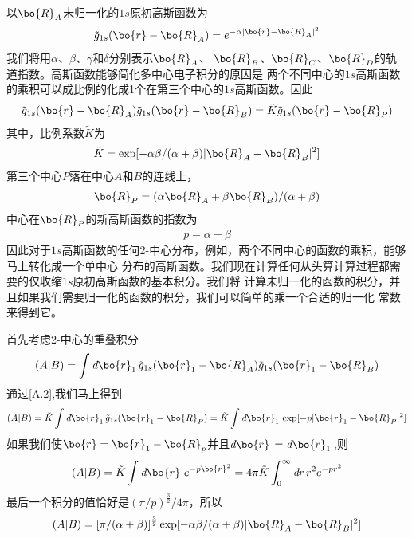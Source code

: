 以$\bo{R}_A$未归一化的$1s$原初高斯函数为
\begin{align}
	\label{A.1}
	\tilde{g}_{1s}(\bo{r}-\bo{R}_A)=e^{-\alpha\lvert \bo{r}-\bo{R}_A \rvert ^2}
\end{align}
我们将用$\alpha$、$\beta$、$\gamma$和$\delta$分别表示$\bo{R}_A$、
$\bo{R}_B$、$\bo{R}_C$、$\bo{R}_D$的轨道指数。高斯函数能够简化多中心电子积分的原因是
两个不同中心的$1s$高斯函数的乘积可以成比例的化成1个在第三个中心的$1s$高斯函数。因此
\begin{align}
	\label{A.2}
	\tilde{g}_{1s}(\bo{r}-\bo{R}_A)\tilde{g}_{1s}(\bo{r}-\bo{R}_B)
	=\tilde{K}\tilde{g}_{1s}(\bo{r}-\bo{R}_P)
\end{align}
其中，比例系数$\tilde{K}$为
\begin{align}
	\label{A.3}
    \tilde{K}=\exp[-\alpha\beta/(\alpha+\beta)\lvert \bo{R}_A-\bo{R}_B \rvert ^2]
\end{align}
第三个中心$P$落在中心$A$和$B$的连线上，
\begin{align}
	\label{A.4}
	\bo{R}_P=(\alpha\bo{R}_A+\beta \bo{R}_B)/(\alpha+\beta)
\end{align}
中心在$\bo{R}_P$的新高斯函数的指数为
\begin{align}
	\label{A.5}
	p=\alpha+\beta
\end{align}
因此对于$1s$高斯函数的任何2-中心分布，例如，两个不同中心的函数的乘积，能够马上转化成一个单中心
分布的高斯函数。我们现在计算任何从头算计算过程都需要的仅收缩$1s$原初高斯函数的基本积分。我们将
计算未归一化的函数的积分，并且如果我们需要归一化的函数的积分，我们可以简单的乘一个合适的归一化
常数来得到它。

首先考虑2-中心的重叠积分
\begin{align}
	\label{A.6}
	(A|B)=\int \emph{d}\bo{r}_1\,\tilde{g}_{1s}(\bo{r}_1-\bo{R}_A)\tilde{g}_{1s}(\bo{r}_1-\bo{R}_B)
\end{align}
通过\autoref{A.2},我们马上得到
\begin{align}
	\label{A.7}
	(A|B)=\tilde{K}\int \emph{d}\bo{r}_1\,\tilde{g}_{1s}(\bo{r}_1-\bo{R}_P)
	=\tilde{K}\int \emph{d}\bo{r}_1\, \exp[-p\lvert \bo{r}_1-\bo{R}_P \rvert ^2]
\end{align}
如果我们使$\bo{r}=\bo{r}_1-\bo{R}_p$并且$\emph{d}\bo{r}\,=\emph{d}\bo{r}_1\,$,则
\begin{align}
	\label{A.8}
	(A|B)=\tilde{K}\int \emph{d}\bo{r}\,\,e^{-p\bo{r}^2}=4\pi\tilde{K}\int_0^{\infty} \emph{d}r\,r^2e^{-pr^2}
\end{align}
最后一个积分的值恰好是$(\pi/p)^{\frac{3}{2}}/{4\pi}$，所以
\begin{align}
	\label{A.9}
	(A|B)=[\pi/(\alpha+\beta)]^{\frac{3}{2}}\exp[-\alpha\beta/(\alpha+\beta)\lvert \bo{R}_A-\bo{R}_B \rvert ^2]
\end{align}

